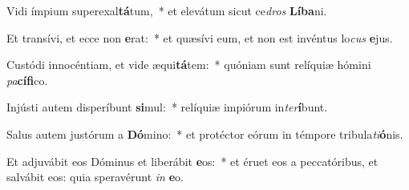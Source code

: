 \item Vidi ímpium superexal\textbf{tá}tum,~* et elevátum sicut ce\textit{dros} \textbf{Lí}\textbf{ba}ni.
\item Et transívi, et ecce non \textbf{e}rat:~* et quæsívi eum, et non est invéntus lo\textit{cus} \textbf{e}jus.
\item Custódi innocéntiam, et vide æqui\textbf{tá}tem:~* quóniam sunt relíquiæ hómini \textit{pa}\textbf{cí}\textbf{fi}co.
\item Injústi autem disperíbunt \textbf{si}mul:~* relíquiæ impiórum in\textit{ter}\textbf{í}bunt.
\item Salus autem justórum a \textbf{Dó}mino:~* et protéctor eórum in témpore tribula\textit{ti}\textbf{ó}nis.
\item Et adjuvábit eos Dóminus et liberábit \textbf{e}os:~* et éruet eos a peccatóribus, et salvábit eos: quia speravérunt \textit{in} \textbf{e}o.
